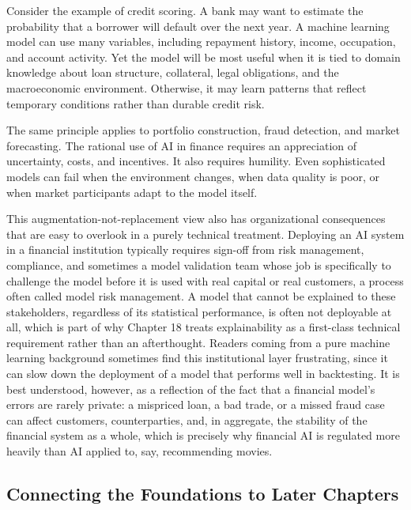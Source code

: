 \documentclass[../ai_in_finance]{subfiles}
\begin{document}
Consider the example of credit scoring. A bank may want to estimate the probability that a borrower will default over the next year. A machine learning model can use many variables, including repayment history, income, occupation, and account activity. Yet the model will be most useful when it is tied to domain knowledge about loan structure, collateral, legal obligations, and the macroeconomic environment. Otherwise, it may learn patterns that reflect temporary conditions rather than durable credit risk.

The same principle applies to portfolio construction, fraud detection, and market forecasting. The rational use of AI in finance requires an appreciation of uncertainty, costs, and incentives. It also requires humility. Even sophisticated models can fail when the environment changes, when data quality is poor, or when market participants adapt to the model itself.

This augmentation-not-replacement view also has organizational consequences that are easy to overlook in a purely technical treatment. Deploying an AI system in a financial institution typically requires sign-off from risk management, compliance, and sometimes a model validation team whose job is specifically to challenge the model before it is used with real capital or real customers, a process often called model risk management. A model that cannot be explained to these stakeholders, regardless of its statistical performance, is often not deployable at all, which is part of why Chapter 18 treats explainability as a first-class technical requirement rather than an afterthought.
Readers coming from a pure machine learning background sometimes find this institutional layer frustrating, since it can slow down the deployment of a model that performs well in backtesting. It is best understood, however, as a reflection of the fact that a financial model's errors are rarely private: a mispriced loan, a bad trade, or a missed fraud case can affect customers, counterparties, and, in aggregate, the stability of the financial system as a whole, which is precisely why financial AI is regulated more heavily than AI applied to, say, recommending movies.

\subsection{Connecting the Foundations to Later Chapters}
\end{document}
